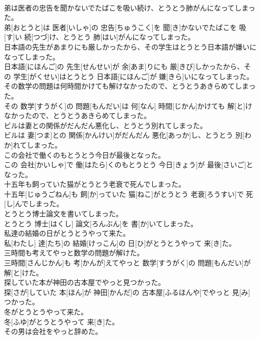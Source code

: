 \documentclass[8pt]{extreport}
\begin{document}
\begin{CJK}{UTF8}{min}
\\	弟は医者の忠告を聞かないでたばこを吸い続け、とうとう肺がんになってしまった。	
\\	弟[おとうと]は 医者[いしゃ]の 忠告[ちゅうこく]を 聞[き]かないでたばこを 吸[す]い 続[つづ]け、とうとう 肺[はい]がんになってしまった。
\\	日本語の先生があまりにも厳しかったから、その学生はとうとう日本語が嫌いになってしまった。	
\\	日本語[にほんご]の 先生[せんせい]が 余[あま]りにも 厳[きび]しかったから、その 学生[がくせい]はとうとう 日本語[にほんご]が 嫌[きら]いになってしまった。
\\	その数学の問題は何時間かけても解けなかったので、とうとうあきらめてしまった。	
\\	その 数学[すうがく]の 問題[もんだい]は 何[なん] 時間[じかん]かけても 解[と]けなかったので、とうとうあきらめてしまった。
\\	ビルは妻との関係がだんだん悪化し、とうとう別れてしまった。	
\\	ビルは 妻[つま]との 関係[かんけい]がだんだん 悪化[あっか]し、とうとう 別[わか]れてしまった。
\\	この会社で働くのもとうとう今日が最後となった。	
\\	この 会社[かいしゃ]で 働[はたら]くのもとうとう 今日[きょう]が 最後[さいご]となった。
\\	十五年も飼っていた猫がとうとう老衰で死んでしまった。	
\\	十五年[じゅうごねん]も 飼[か]っていた 猫[ねこ]がとうとう 老衰[ろうすい]で 死[し]んでしまった。
\\	とうとう博士論文を書いてしまった。	
\\	とうとう 博士[はくし] 論文[ろんぶん]を 書[か]いてしまった。
\\	私達の結婚の日がとうとうやって来た。	
\\	私[わたし] 達[たち]の 結婚[けっこん]の 日[ひ]がとうとうやって 来[き]た。
\\	三時間も考えてやっと数学の問題が解けた。	
\\	三時間[さんじかん]も 考[かんが]えてやっと 数学[すうがく]の 問題[もんだい]が 解[と]けた。
\\	探していた本が神田の古本屋でやっと見つかった。	
\\	探[さが]していた 本[ほん]が 神田[かんだ]の 古本屋[ふるほんや]でやっと 見[み]つかった。
\\	冬がとうとうやって来た。	
\\	冬[ふゆ]がとうとうやって 来[き]た。
\\	その男は会社をやっと辞めた。	

\end{CJK}
\end{document}

